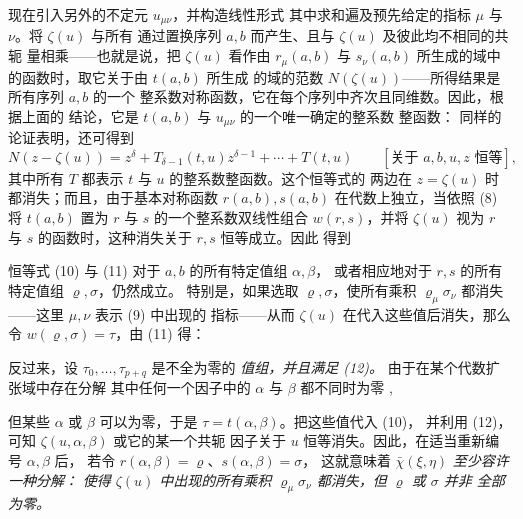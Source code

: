 现在引入另外的不定元 $u_{\mu\nu}$，并构造线性形式
其中求和遍及预先给定的指标 $\mu$ 与 $\nu$。将 $\zeta(u)$ 与所有
通过置换序列 $a,b$ 而产生、且与 $\zeta(u)$ 及彼此均不相同的共轭
量相乘——也就是说，把 $\zeta(u)$ 看作由 $r_\mu(a,b)$ 与
$s_\nu(a,b)$ 所生成的域中的函数时，取它关于由 $t(a,b)$ 所生成
的域的范数 $N(\zeta(u))$——所得结果是所有序列 $a,b$ 的一个
整系数对称函数，它在每个序列中齐次且同维数。因此，根据上面的
结论，它是 $t(a,b)$ 与 $u_{\mu\nu}$ 的一个唯一确定的整系数
整函数：
同样的论证表明，还可得到
\[
N(z-\zeta(u))=z^\delta+T_{\delta-1}(t,u)z^{\delta-1}+\cdots+T(t,u)
\qquad[\text{关于 }a,b,u,z\text{ 恒等}],
\]
其中所有 $T$ 都表示 $t$ 与 $u$ 的整系数整函数。这个恒等式的
两边在 $z=\zeta(u)$ 时都消失；而且，由于基本对称函数
$r(a,b),s(a,b)$ 在代数上独立，当依照 (8) 将 $t(a,b)$ 置为
$r$ 与 $s$ 的一个整系数双线性组合 $w(r,s)$，并将 $\zeta(u)$
视为 $r$ 与 $s$ 的函数时，这种消失关于 $r,s$ 恒等成立。因此
得到
\addtocounter{footnote}{1}

恒等式 (10) 与 (11) 对于 $a,b$ 的所有特定值组 $\alpha,\beta$，
或者相应地对于 $r,s$ 的所有特定值组 $\varrho,\sigma$，仍然成立。
特别是，如果选取 $\varrho,\sigma$，使所有乘积
$\varrho_\mu\sigma_\nu$ 都消失——这里 $\mu,\nu$ 表示 (9) 中出现的
指标——从而 $\zeta(u)$ 在代入这些值后消失，那么令
$w(\varrho,\sigma)=\tau$，由 (11) 得：

反过来，设 $\tau_0,\ldots,\tau_{p+q}$ 是不全为零的
\emph{值组，并且满足 (12)。} 由于在某个代数扩张域中存在分解
其中任何一个因子中的 $\alpha$ 与 $\beta$ 都不同时为零
,\addtocounter{footnote}{1} 但某些 $\alpha$ 或 $\beta$
可以为零，于是 $\tau=t(\alpha,\beta)$。把这些值代入 (10)，
并利用 (12)，可知 $\zeta(u,\alpha,\beta)$ 或它的某一个共轭
因子关于 $u$ 恒等消失。因此，在适当重新编号 $\alpha,\beta$ 后，
若令 $r(\alpha,\beta)=\varrho$、$s(\alpha,\beta)=\sigma$，
这就意味着 $\bar\chi(\xi,\eta)$ \emph{至少容许一种分解：}
\emph{使得 $\zeta(u)$ 中出现的所有乘积
$\varrho_\mu\sigma_\nu$ 都消失，但 $\varrho$ 或 $\sigma$ 并非
全部为零。}

